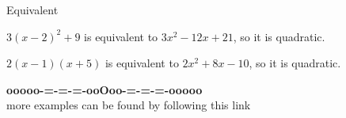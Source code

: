 \documentclass{ximera}
\begin{document}
\begin{example} Equivalent


$3(x-2)^2 + 9$ is equivalent to $3 x^2 - 12 x + 21$, so it is quadratic.




$2(x-1)(x+5)$ is equivalent to $2 x^2 + 8 x - 10$, so it is quadratic.




\end{example}



























\begin{onlineOnly}
\begin{center}
\textbf{\textcolor{green!50!black}{ooooo-=-=-=-ooOoo-=-=-=-ooooo}} \\

more examples can be found by following this link\\ 

\end{center}
\end{onlineOnly}
\end{document}
